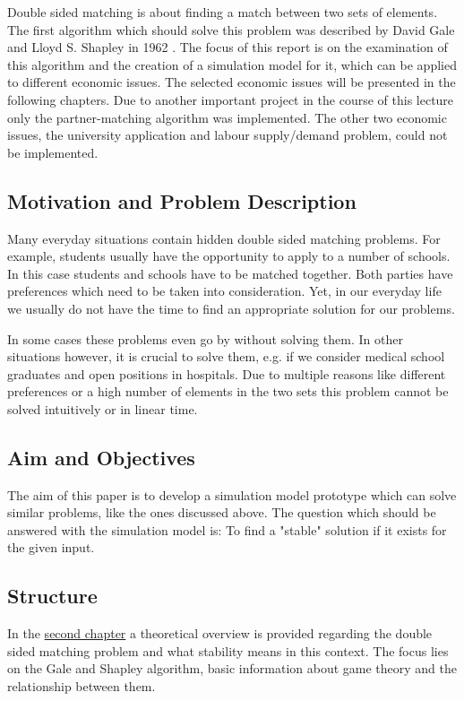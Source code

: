\label{introduction}
Double sided matching is about finding a match between two sets of elements.
The first algorithm which should solve this problem was described by David Gale and Lloyd S. Shapley in 1962 \cite{gale62a}. 
The focus of this report is on the examination of this algorithm and the creation of a simulation model for it, which can be applied to different economic issues.
The selected economic issues will be presented in the following chapters. 
Due to another important project in the course of this lecture only the partner-matching algorithm was implemented.
The other two economic issues, the university application and labour supply/demand problem, could not be implemented.

\subsection{Motivation and Problem Description}
Many everyday situations contain hidden double sided matching problems. 
For example, students usually have the opportunity to apply to a number of schools. 
In this case students and schools have to be matched together. 
Both parties have preferences which need to be taken into consideration. 
Yet, in our everyday life we usually do not have the time to find an appropriate solution for our problems. 

In some cases these problems even go by without solving them. 
In other situations however, it is crucial to solve them, e.g. if we consider medical school graduates and open positions in hospitals. 
Due to multiple reasons like different preferences or a high number of elements in the two sets this problem cannot be solved intuitively or in linear time.

\subsection{Aim and Objectives}
The aim of this paper is to develop a simulation model prototype which can solve similar problems, like the ones discussed above.
The question which should be answered with the simulation model is: To find a "stable" solution if it exists for the given input.

\subsection{Structure}
In the \hyperref[theory]{second chapter} a theoretical overview is provided regarding the double sided matching problem and what stability means in this context.
The focus lies on the Gale and Shapley algorithm, basic information about game theory and the relationship between them.

